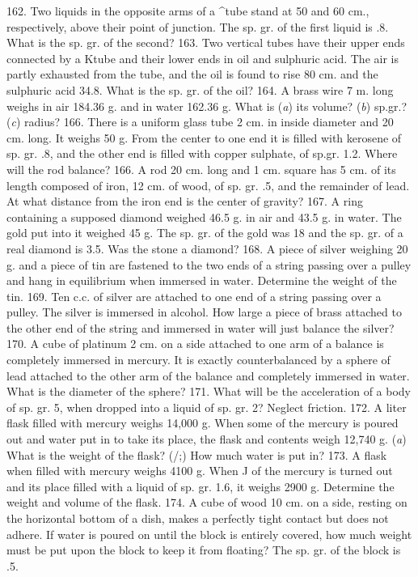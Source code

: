 162. Two liquids in the opposite arms of a ^tube stand at 50 and 60 cm., respectively, above their point of junction. The sp. gr. of the first liquid is .8. What is the sp. gr. of the second?
163. Two vertical tubes have their upper ends connected by a Ktube and their lower ends in oil and sulphuric acid. The air is partly exhausted from the tube, and the oil is found to rise 80 cm. and the sulphuric acid 34.8. What is the sp. gr. of the oil?
164. A brass wire 7 m. long weighs in air 184.36 g. and in water 162.36 g. What is (\emph{a}) its volume? (\emph{b}) sp.gr.? (\emph{c}) radius?
166. There is a uniform glass tube 2 cm. in inside diameter and 20 cm. long. It weighs 50 g. From the center to one end it is filled with kerosene of sp. gr. .8, and the other end is filled with copper sulphate, of sp.gr. 1.2. Where will the rod balance?
166. A rod 20 cm. long and 1 cm. square has 5 cm. of its length composed of iron, 12 cm. of wood, of sp. gr. .5, and the remainder of lead. At what distance from the iron end is the center of gravity?
167. A ring containing a supposed diamond weighed 46.5 g. in air and 43.5 g. in water. The gold put into it weighed 45 g. The sp. gr. of the gold was 18 and the sp. gr. of a real diamond is 3.5. Was the stone a diamond?
168. A piece of silver weighing 20 g. and a piece of tin are fastened to the two ends of a string passing over a pulley and hang in equilibrium when immersed in water. Determine the weight of the tin.
169. Ten c.c. of silver are attached to one end of a string passing over a pulley. The silver is immersed in alcohol. How large a piece of brass attached to the other end of the string and immersed in water will just balance the silver?
170. A cube of platinum 2 cm. on a side attached to one arm of a balance is completely immersed in mercury. It is exactly counterbalanced by a sphere of lead attached to the other arm of the balance and completely immersed in water. What is the diameter of the sphere?
171. What will be the acceleration of a body of sp. gr. 5, when dropped into a liquid of sp. gr. 2? Neglect friction.
172. A liter flask filled with mercury weighs 14,000 g. When some of the mercury is poured out and water put in to take its place, the flask and contents weigh 12,740 g. (\emph{a}) What is the weight of the flask? (/;) How much water is put in?
173. A flask when filled with mercury weighs 4100 g. When J of the mercury is turned out and its place filled with a liquid of sp. gr. 1.6, it weighs 2900 g. Determine the weight and volume of the flask.
174. A cube of wood 10 cm. on a side, resting on the horizontal bottom of a dish, makes a perfectly tight contact but does not adhere. If water is poured on until the block is entirely covered, how much weight must be put upon the block to keep it from floating? The sp. gr. of the block is .5.

